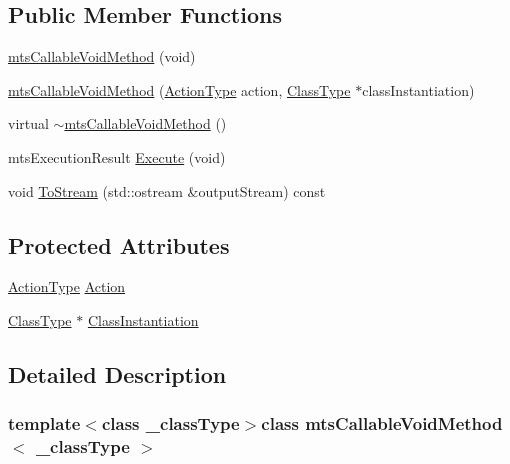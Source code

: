 \subsection*{Public Member Functions}
\begin{DoxyCompactItemize}
\item 
\hyperlink{classmts_callable_void_method_a158a2148635b673b555cb8dcd086d1c7}{mts\+Callable\+Void\+Method} (void)
\item 
\hyperlink{classmts_callable_void_method_afb25fb92ad9d9e3da75bdd5366825d10}{mts\+Callable\+Void\+Method} (\hyperlink{classmts_callable_void_method_af30fcc122aaea0b5870f22f57cf5e5ba}{Action\+Type} action, \hyperlink{classmts_callable_void_method_a912290d7a57cc13fd33481e16d471467}{Class\+Type} $\ast$class\+Instantiation)
\item 
virtual \hyperlink{classmts_callable_void_method_acef41c52bec2a6e4006fcd0b69e632d3}{$\sim$mts\+Callable\+Void\+Method} ()
\item 
mts\+Execution\+Result \hyperlink{classmts_callable_void_method_afb66294b89a3c6281c70c462e3bf6c85}{Execute} (void)
\item 
void \hyperlink{classmts_callable_void_method_a252f8bc56f87741e9ad72319ead73302}{To\+Stream} (std\+::ostream \&output\+Stream) const 
\end{DoxyCompactItemize}
\subsection*{Protected Attributes}
\begin{DoxyCompactItemize}
\item 
\hyperlink{classmts_callable_void_method_af30fcc122aaea0b5870f22f57cf5e5ba}{Action\+Type} \hyperlink{classmts_callable_void_method_a120365b9d9e484ec6c6d8dd4b5259abd}{Action}
\item 
\hyperlink{classmts_callable_void_method_a912290d7a57cc13fd33481e16d471467}{Class\+Type} $\ast$ \hyperlink{classmts_callable_void_method_a51691984cb4776eeb1e7871df86b463e}{Class\+Instantiation}
\end{DoxyCompactItemize}


\subsection{Detailed Description}
\subsubsection*{template$<$class \+\_\+class\+Type$>$class mts\+Callable\+Void\+Method$<$ \+\_\+class\+Type $>$}

